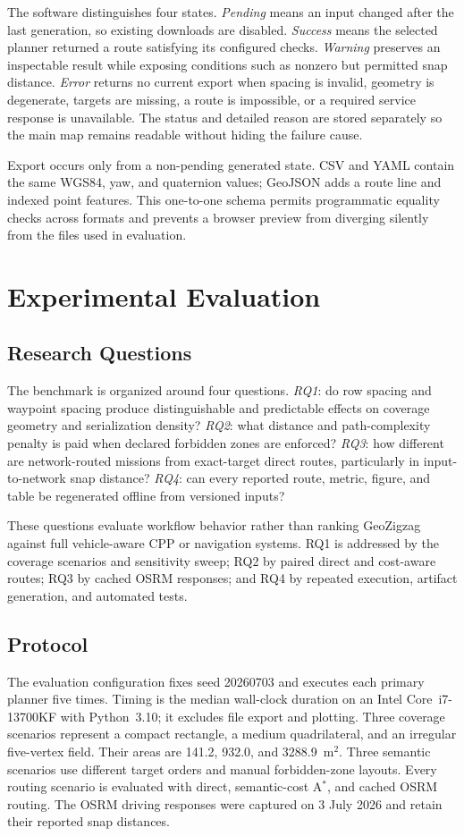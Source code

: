 \documentclass[conference,a4paper]{IEEEtran}
\begin{document}
The software distinguishes four states. \emph{Pending} means an input changed
after the last generation, so existing downloads are disabled. \emph{Success}
means the selected planner returned a route satisfying its configured checks.
\emph{Warning} preserves an inspectable result while exposing conditions such
as nonzero but permitted snap distance. \emph{Error} returns no current export
when spacing is invalid, geometry is degenerate, targets are missing, a route
is impossible, or a required service response is unavailable. The status and
detailed reason are stored separately so the main map remains readable without
hiding the failure cause.

Export occurs only from a non-pending generated state. CSV and YAML contain the
same WGS84, yaw, and quaternion values; GeoJSON adds a route line and indexed
point features. This one-to-one schema permits programmatic equality checks
across formats and prevents a browser preview from diverging silently from the
files used in evaluation.

\section{Experimental Evaluation}
\subsection{Research Questions}
The benchmark is organized around four questions. \emph{RQ1}: do row spacing
and waypoint spacing produce distinguishable and predictable effects on
coverage geometry and serialization density? \emph{RQ2}: what distance and
path-complexity penalty is paid when declared forbidden zones are enforced?
\emph{RQ3}: how different are network-routed missions from exact-target direct
routes, particularly in input-to-network snap distance? \emph{RQ4}: can every
reported route, metric, figure, and table be regenerated offline from versioned
inputs?

These questions evaluate workflow behavior rather than ranking GeoZigzag
against full vehicle-aware CPP or navigation systems. RQ1 is addressed by the
coverage scenarios and sensitivity sweep; RQ2 by paired direct and cost-aware
routes; RQ3 by cached OSRM responses; and RQ4 by repeated execution, artifact
generation, and automated tests.

\subsection{Protocol}
The evaluation configuration fixes seed 20260703 and executes each primary
planner five times. Timing is the median wall-clock duration on an Intel
Core~i7-13700KF with Python~3.10; it excludes file export and plotting. Three
coverage scenarios represent a compact rectangle, a medium quadrilateral, and
an irregular five-vertex field. Their areas are 141.2, 932.0, and
3288.9~m$^2$. Three semantic scenarios use different target orders and manual
forbidden-zone layouts. Every routing scenario is evaluated with direct,
semantic-cost A$^\ast$, and cached OSRM routing. The OSRM driving responses
were captured on 3 July 2026 and retain their reported snap distances.
\end{document}
